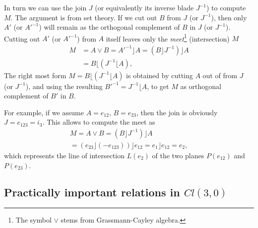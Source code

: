 \documentclass[cameraready]{jcmsi}%
\begin{document}
In turn we can use the join $J$ (or equivalently its inverse blade $J^{-1}$) to compute $M$. The argument is from set theory. If we cut out $B$ from $J$ (or $J^{-1}$), then only $A'$ (or $A'^{-1}$) will remain as the orthogonal complement of $B$ in $J$ (or $J^{-1}$). Cutting out $A'$ (or $A'^{-1}$) from $A$ itself leaves only the \textit{meet}\footnote{The symbol $\vee$ stems from Grassmann-Cayley algebra.} (intersection) $M$
\begin{align}
   M &= A \vee B = A'^{-1} \rfloor A = (B\rfloor J^{-1})\rfloor A 
   \nonumber \\
   &= B\lfloor (J^{-1}\lfloor A),
\end{align}
The right most form $M = B\lfloor (J^{-1}\lfloor A)$ is obtained by cutting $A$ out of from $J$ (or $J^{-1}$), and using the resulting $B'^{-1}=J^{-1}\lfloor A$, to get $M$ as orthogonal complement of $B'$ in $B$. 

For example, if we assume $A=e_{12}$, $B=e_{23}$, then the join is obviously $J=e_{123}=i_3$. This allows to compute the meet as
\begin{gather} 
  M = A \vee B 
  = (B\rfloor J^{-1})\rfloor A
  \nonumber \\
  = (e_{23}\rfloor(-e_{123}))\rfloor e_{12}
  = e_1\rfloor e_{12}=e_2,
\end{gather}  
which represents the line of intersection $L(e_2)$ of the two planes $P(e_{12})$ and $P(e_{23})$.


\subsection{Practically important relations in $Cl(3,0)$}
\end{document}
